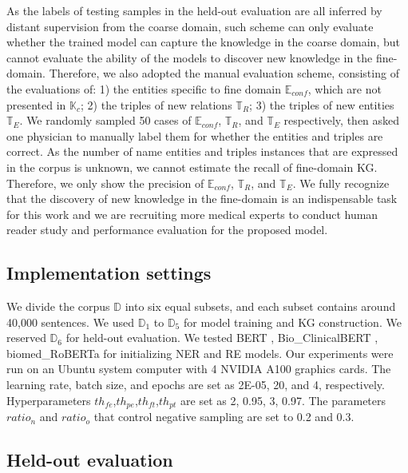 \documentclass[sigconf]{acmart}
\begin{document}
As the labels of testing samples in the held-out evaluation are all inferred by distant supervision from the coarse domain, such scheme can only evaluate whether the trained model can capture the knowledge in the coarse domain, but cannot evaluate the ability of the models to discover new knowledge in the fine-domain. Therefore, we also adopted the manual evaluation scheme, consisting of the evaluations of: 1) the entities specific to fine domain $\mathbb{E}_{conf}$, which are not presented in $\mathbb{K}_c$; 2) the triples of new relations $\mathbb{T}_R$; 3) the triples of new entities $\mathbb{T}_E$. We randomly sampled 50 cases of $\mathbb{E}_{conf}$, $\mathbb{T}_R$, and $\mathbb{T}_E$ respectively, then asked one physician to manually label them for whether the entities and triples are correct. As the number of name entities and triples instances that are expressed in the corpus is unknown, we cannot estimate the recall of fine-domain KG. Therefore, we only show the precision of $\mathbb{E}_{conf}$, $\mathbb{T}_R$, and $\mathbb{T}_E$. We fully recognize that the discovery of new knowledge in the fine-domain is an indispensable task for this work and we are recruiting more medical experts to conduct human reader study and performance evaluation for the proposed model. 

\subsection{Implementation settings}
We divide the corpus $\mathbb{D}$ into six equal subsets, and each subset contains around 40,000 sentences. We used $\mathbb{D}_1$ to $\mathbb{D}_5$ for model training and KG construction. We reserved $\mathbb{D}_6$ for held-out evaluation. We tested BERT \cite{kenton2019bert}, Bio\_ClinicalBERT \cite{alsentzer2019publicly}, biomed\_RoBERTa \cite{gururangan2020don} for initializing NER and RE models. Our experiments were run on an Ubuntu system computer with 4 NVIDIA A100 graphics cards. The learning rate, batch size, and epochs are set as 2E-05, 20, and 4, respectively. Hyperparameters $th_{fe}$,$th_{pe}$,$th_{ft}$,$th_{pt}$ are set as 2, 0.95, 3, 0.97. The parameters ${ratio_n}$ and ${ratio_o}$ that control negative sampling are set to 0.2 and 0.3.


\subsection{Held-out evaluation}
\end{document}
